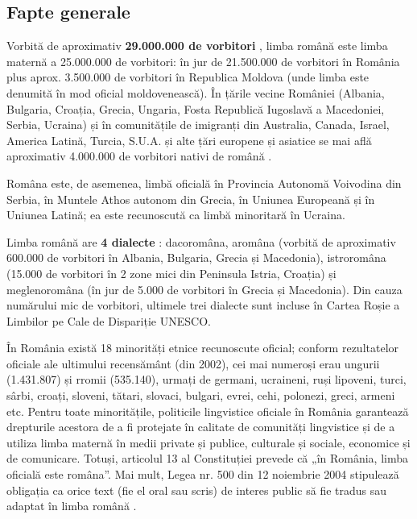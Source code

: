 \begin{multicols}{2}
\subsection{Fapte generale}
Vorbită de aproximativ \textbf{29.000.000 de vorbitori} \cite{vintila}, limba română este limba maternă a 25.000.000 de vorbitori: în jur de 21.500.000 de vorbitori în România \cite{stat1} plus aprox. 3.500.000 de vorbitori în Republica Moldova \cite{stat2} (unde limba este denumită în mod oficial moldovenească). În țările vecine României (Albania, Bulgaria, Croația, Grecia, Ungaria, Fosta Republică Iugoslavă a Macedoniei, Serbia, Ucraina) și în comunitățile de imigranți din Australia, Canada, Israel, America Latină, Turcia, S.U.A. și alte țări europene și asiatice se mai află aproximativ 4.000.000 de vorbitori nativi de română \cite{urlRom_diaspora}.

Româna este, de asemenea, limbă oficială în Provincia Autonomă Voivodina din Serbia, în Muntele Athos autonom din Grecia, în Uniunea Europeană și în Uniunea Latină; ea este recunoscută ca limbă minoritară în Ucraina.

Limba română are \textbf{4 dialecte} \cite{sala}: dacoromâna, aromâna (vorbită de aproximativ 600.000 de vorbitori în Albania, Bulgaria, Grecia și Macedonia), istroromâna (15.000 de vorbitori în 2 zone mici din Peninsula Istria, Croația) și meglenoromâna (în jur de 5.000 de vorbitori în Grecia și Macedonia). Din cauza numărului mic de vorbitori, ultimele trei dialecte sunt incluse în Cartea Roșie a Limbilor pe Cale de Dispariție UNESCO.

În România există 18 minorități etnice recunoscute oficial; conform rezultatelor oficiale ale ultimului recensământ (din 2002), cei mai numeroși erau ungurii (1.431.807) și rromii (535.140), urmați de germani, ucraineni, ruși lipoveni, turci, sârbi, croați, sloveni, tătari, slovaci, bulgari, evrei, cehi, polonezi, greci, armeni etc. Pentru toate minoritățile, politicile lingvistice oficiale în România garantează drepturile acestora de a fi protejate în calitate de comunități lingvistice și de a utiliza limba maternă în medii private și publice, culturale și sociale, economice și de comunicare. Totuși, articolul 13 al Constituției prevede că „în România, limba oficială este româna”. Mai mult, Legea nr. 500 din 12 noiembrie 2004 stipulează obligația ca orice text (fie el oral sau scris) de interes public să fie tradus sau adaptat în limba română \cite{urlEFNIL}.


\end{multicols}
